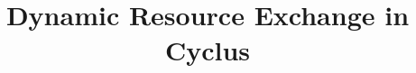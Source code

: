 \documentclass{ntmanuscript}
\title{Dynamic Resource Exchange in Cyclus}
\date{}
\begin{document}






\cite{gidden_agent-based_2013}



\end{document}

